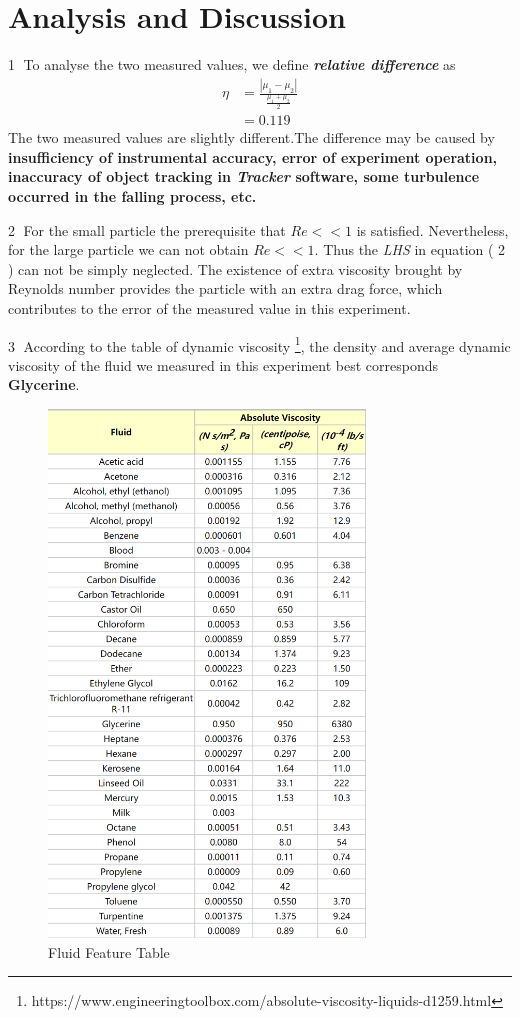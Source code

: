 \documentclass{report}
\begin{document}
\section{Analysis and Discussion}
\textcircled{\small 1} To analyse the two measured values, we define \textbf{\textit{relative difference}} as
\begin{equation}
\begin{aligned}
    \eta &= \frac{|\mu_1 - \mu_2|}{\frac{\mu_1 + \mu_2}{2}} \\
    & = 0.119
\end{aligned}
\end{equation}
The two measured values are slightly different.The difference may be caused by \textbf{insufficiency of instrumental accuracy, error of experiment operation, inaccuracy of object tracking in \textit{Tracker} software, some turbulence occurred in the falling process, etc.}
\par
\textcircled{\small 2} For the small particle the prerequisite that $Re << 1$ is satisfied. Nevertheless, for the large particle we can not obtain $Re << 1$. Thus the \textit{LHS} in equation ( 2 ) can not be simply neglected. The existence of extra viscosity brought by Reynolds number provides the particle with an extra drag force, which contributes to the error of the measured value in this experiment.
\par
\textcircled{\small 3} According to the table of dynamic viscosity \footnote{https://www.engineeringtoolbox.com/absolute-viscosity-liquids-d1259.html}, the density and average dynamic viscosity of the fluid we measured in this experiment best corresponds \textbf{Glycerine}.
\begin{figure}[H]
    \centering
    \includegraphics[height = 14cm]{Auxiliary Files/ENGG1350 Experiment Data/Dynamic Viscosity.png}
    \caption{Fluid Feature Table}
    \label{fig:my_label}
\end{figure}
\clearpage
\end{document}
